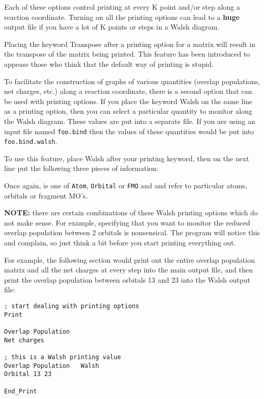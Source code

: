 Each of these options control printing at every K point and/or step
along a reaction coordinate.  Turning on all the printing options can
lead to a {\bf huge} output file if you have a lot of K points or
steps in a Walsh diagram.

Placing the keyword {\sf Transpose} after a printing option for a
matrix will result in the transpose of the matrix being printed.  This
feature has been introduced to appease those who think that the default
way of printing is stupid.

To facilitate the construction of graphs of various quantities
(overlap populations, net charges, etc.) along a reaction coordinate,
there is a second option that can be used with printing options.  If
you place the keyword {\sf Walsh} on the same line as a printing
option, then you can select a particular quantity to monitor along the
Walsh diagram.  These values are put into a separate file.  If you are
using an input file named {\tt foo.bind} then the values of these
quantities would be put into {\tt foo.bind.walsh}.

To use this feature, place {\sf Walsh} after your
printing keyword, then on the next line put the following three pieces
of information:

  

Once again,  is one of {\tt Atom}, {\tt Orbital} or {\tt FMO} and
 and  refer to particular atoms,
orbitals or fragment MO's.

{\bf NOTE:} there are certain combinations of these Walsh printing
options which do not make sense.  For example, specifying that you
want to monitor the reduced overlap population between 2 orbitals is
nonsensical.  The program will notice this and complain, so just think
a bit before you start printing everything out.

For example, the following section would print out the entire overlap
population matrix and all the net charges at every step into the main
output file, and then
print the overlap population between orbitals 13 and 23 into the Walsh
output file:

\shrinkspacing
\begin{verbatim}
; start dealing with printing options
Print

Overlap Population
Net charges

; this is a Walsh printing value
Overlap Population   Walsh
Orbital 13 23

End_Print
\end{verbatim}
\resumespacing


